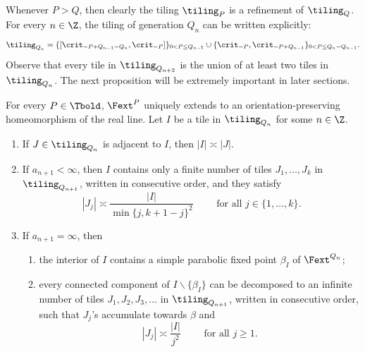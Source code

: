 \documentclass{amsart}
\begin{document}
Whenever $P>Q$, then clearly the tiling $\tiling_P$ is a refinement of $\tiling_Q$. 
For every $n \in \Z$, the tiling of generation $Q_n$ can be written explicitly:
\[
    \tiling_{Q_n} = \{[\crit_{-P+Q_{n-1}-Q_n}, \crit_{-P}]\}_{0<P\leq Q_{n-1}} \cup \{\crit_{-P}, \crit_{-P+Q_{n-1}}\}_{0<P\leq Q_{n}-Q_{n-1}}.
\]
Observe that every tile in $\tiling_{Q_{n+2}}$ is the union of at least two tiles in $\tiling_{Q_{n}}$. 
The next proposition will be extremely important in later sections.

\begin{proposition}
\label{prop:R-apb-transcendental}
    For every $P \in \Tbold$, $\Fext^P$ uniquely extends to an orientation-preserving homeomorphism of the real line. 
    Let $I$ be a tile in $\tiling_{Q_n}$ for some $n \in \Z$.
    \begin{enumerate}
        \item If $J \in \tiling_{Q_n}$ is adjacent to $I$, then $|I| \asymp |J|$.
        \item If $a_{n+1} < \infty$, then $I$ contains only a finite number of tiles $J_1,\ldots, J_k$ in $\tiling_{Q_{n+1}}$, written in consecutive order, and they satisfy
        \[
            |J_j| \asymp \frac{|I|}{\min\{j,k+1-j\}^2} \qquad \text{ for all } j \in \{1,\ldots,k\}.
        \]
        \item If $a_{n+1} = \infty$, then
        \begin{enumerate}[label=\textnormal{(\alph*)}]
            \item the interior of $I$ contains a simple parabolic fixed point $\beta_I$ of $\Fext^{Q_n}$;
            \item every connected component of $I \backslash \{\beta_I\}$ can be decomposed to an infinite number of tiles $J_1,J_2,J_3,\ldots$ in $\tiling_{Q_{n+1}}$, written in consecutive order, such that $J_j$'s accumulate towards $\beta$ and
        \[
            |J_j| \asymp \frac{|I|}{j^2} \qquad \text{ for all } j \geq 1.
        \]
        \end{enumerate}
    \end{enumerate}
\end{proposition}
\end{document}
